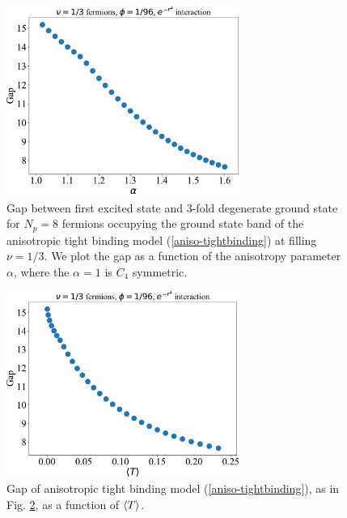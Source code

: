 \documentclass[aps,prb,twocolumn,letterpaper,twoside,nobalancelastpage,groupedaddress,amsmath,amssymb,floatfix,citeautoscript]{revtex4-1}
\begin{document}
\begin{figure}[htb]
\includegraphics[width=3.0in]{gap-v-aniso-fermions-96-exponential.pdf}
\caption{\label{gap-vs-aniso-plot} Gap between first excited state and 3-fold degenerate ground state for $N_p = 8$ fermions occupying the ground state band of the anisotropic tight binding model (\ref{aniso-tightbinding}) at filling $\nu=1/3$. We plot the gap as a function of the anisotropy parameter $\alpha$, where the $\alpha=1$ is $C_4$ symmetric.}
\end{figure}

\begin{figure}[htb]
\includegraphics[width=3.0in]{gap-v-trace-aniso-fermions-96-exponential.pdf}
\caption{\label{gap-vs-aniso-plot} Gap of anisotropic tight binding model (\ref{aniso-tightbinding}), as in Fig. \ref{gap-vs-aniso-plot}, as a function of $\expval{T}$.}
\end{figure}


\end{document}
